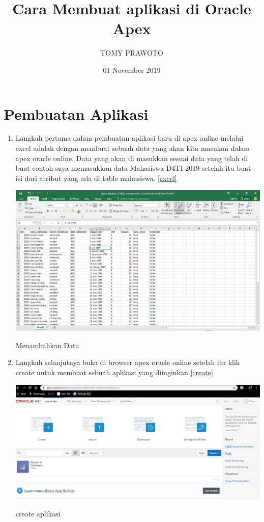 \documentclass{article}
\title{Cara Membuat aplikasi di Oracle Apex}
\author{TOMY PRAWOTO }
\date{01 November 2019}
\begin{document}
\maketitle

\section{Pembuatan Aplikasi}

\begin{enumerate}
    \item Langkah pertama dalam pembuatan aplikasi baru di apex online melalui excel adalah dengan membuat sebuah data yang akan kita masukan dalam apex oracle online. Data yang akan di masukkan sesuai data yang telah di buat contoh saya memasukkan data Mahasiswa D4TI 2019 
    setelah itu buat isi dari atribut yang ada di table mahasiswa.
    \ref{excel}
    \begin{center}
         \centering
            \includegraphics[scale=0.27]{figures/DB0.png}
        \caption{Menambahkan Data}
        \label{excel}
    \end{center}
       
     \item Langkah selanjutnya buka di browser apex oracle online setelah itu klik create untuk membuat sebuah aplikasi yang diinginkan
      \ref{create}
    \begin{center}
         \centering
            \includegraphics[scale=0.27]{figures/DB1.png}
        \caption{create aplikasi}
        \label{create}
    \end{center}
    

\end{enumerate}
\end{document}
